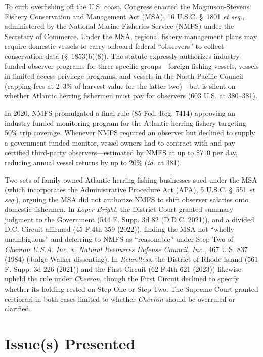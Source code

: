 \documentclass[12pt]{article}
\begin{document}
To curb overfishing off the U.S. coast, Congress enacted the Magnuson-Stevens Fishery Conservation and Management Act (MSA), 16 U.S.C. \S~1801 \textit{et seq.}, administered by the National Marine Fisheries Service (NMFS) under the Secretary of Commerce. Under the MSA, regional fishery management plans may require domestic vessels to carry onboard federal ``observers'' to collect conservation data (\S~1853(b)(8)). The statute expressly authorizes industry-funded observer programs for three specific groups---foreign fishing vessels, vessels in limited access privilege programs, and vessels in the North Pacific Council (capping fees at 2--3\% of harvest value for the latter two)---but is silent on whether Atlantic herring fishermen must pay for observers (\href{https://www.law.cornell.edu/supremecourt/text/22-451}{603 U.S. at 380--381}).

In 2020, NMFS promulgated a final rule (85 Fed. Reg. 7414) approving an industry-funded monitoring program for the Atlantic herring fishery targeting 50\% trip coverage. Whenever NMFS required an observer but declined to supply a government-funded monitor, vessel owners had to contract with and pay certified third-party observers---estimated by NMFS at up to \$710 per day, reducing annual vessel returns by up to 20\% (\textit{id.} at 381).

Two sets of family-owned Atlantic herring fishing businesses sued under the MSA (which incorporates the Administrative Procedure Act (APA), 5 U.S.C. \S~551 \textit{et seq.}), arguing the MSA did not authorize NMFS to shift observer salaries onto domestic fishermen. In \textit{Loper Bright}, the District Court granted summary judgment to the Government (544 F. Supp. 3d 82 (D.D.C. 2021)), and a divided D.C. Circuit affirmed (45 F.4th 359 (2022)), finding the MSA not ``wholly unambiguous'' and deferring to NMFS as ``reasonable'' under Step Two of \href{https://supreme.justia.com/cases/federal/us/467/837/}{\textit{Chevron U.S.A. Inc. v. Natural Resources Defense Council, Inc.}}, 467 U.S. 837 (1984) (Judge Walker dissenting). In \textit{Relentless}, the District of Rhode Island (561 F. Supp. 3d 226 (2021)) and the First Circuit (62 F.4th 621 (2023)) likewise upheld the rule under \textit{Chevron}, though the First Circuit declined to specify whether its holding rested on Step One or Step Two. The Supreme Court granted certiorari in both cases limited to whether \textit{Chevron} should be overruled or clarified.

\section{Issue(s) Presented}
\end{document}
